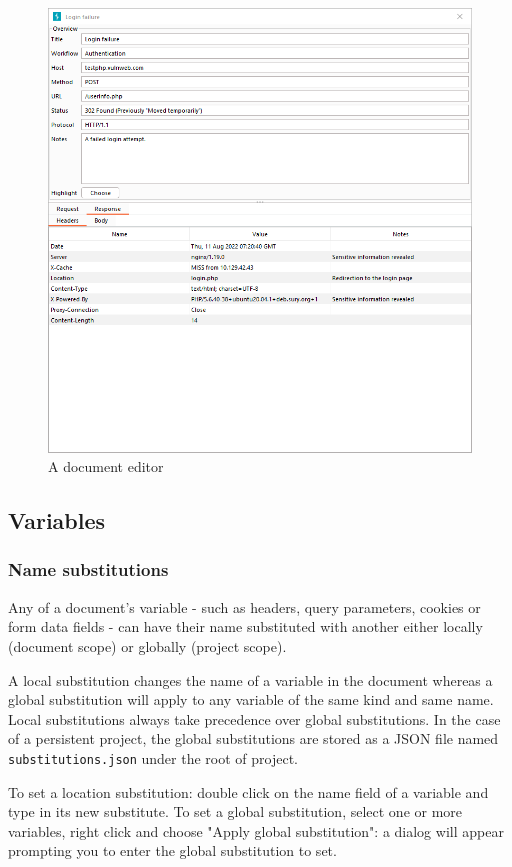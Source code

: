 \documentclass{article}
\begin{document}
\begin{figure}[h]
    \centering
    \includegraphics[width=0.75\linewidth]{assets/document_editor.png}
    \caption{A document editor}
    \label{fig:document editor}
\end{figure}

\subsection{Variables}

\subsubsection{Name substitutions}

Any of a document's variable - such as headers, query parameters, cookies or form data fields - can have their name substituted with another either locally (document scope) or globally (project scope).

A local substitution changes the name of a variable in the document whereas a global substitution will apply to any variable of the same kind and same name. Local substitutions always take precedence over global substitutions. In the case of a persistent project, the global substitutions are stored as a JSON file named \verb|substitutions.json| under the root of project.

To set a location substitution: double click on the name field of a variable and type in its new substitute. To set a global substitution, select one or more variables, right click and choose "Apply global substitution": a dialog will appear prompting you to enter the global substitution to set. 
\end{document}

